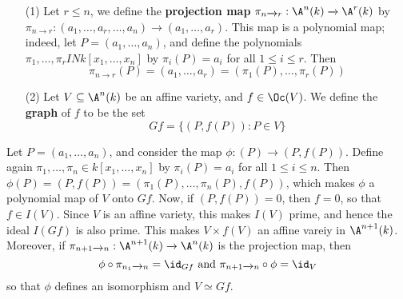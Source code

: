 \begin{example}\label{example_2.2}
  \begin{enumerate}
    \item[(1)] Let $r \leq n$, we define the \textbf{projection map}
      $\pi_{n \xrightarrow{} r}:\A^n(k) \xrightarrow{} \A^r(k)$ by
      $\pi_{n \xrightarrow{} r}:(a_1, \dots, a_r, \dots, a_n) \xrightarrow{}
      (a_1, \dots, a_r)$. This map is a polynomial map; indeed, let $P=(a_1,
      \dots, a_n)$, and define the polynomials $\pi_1, \dots, \pi_r IN k[x_1,
      \dots, x_n]$ by $\pi_i(P)=a_i$ for all $1 \leq i \leq r$. Then
      \begin{equation*}
        \pi_{n \xrightarrow{} r}(P)=(a_1, \dots, a_r)=(\pi_1(P), \dots, \pi_r(P))
      \end{equation*}

    \item[(2)] Let $V \subseteq \A^n(k)$ be an affine variety, and $f \in
      \Oc(V)$. We define the \textbf{graph} of $f$ to be the set
      \begin{equation}\label{equation_2.1}
        G{f}=\{(P, f(P)) : P \in V\}
      \end{equation}
  \end{enumerate}
  Let $P=(a_1, \dots, a_n)$, and consider the map $\phi:(P) \xrightarrow{} (P,
  f(P))$. Define again $\pi_1, \dots, \pi_n \in k[x_1, \dots, x_n]$ by
  $\pi_i(P)=a_i$ for all $1 \leq i \leq n$. Then $\phi(P)=(P,f(P))=(\pi_1(P),
  \dots, \pi_n(P), f(P))$, which makes $\phi$ a polynomial map of $V$ onto $G{f}$.
  Now, if $(P,f(P))=0$, then $f=0$, so that $f \in I(V)$. Since $V$ is an affine
  variety, this makes  $I(V)$ prime, and hence the ideal $I(G{f})$ is also prime.
  This makes $V \times f(V)$ an affine vareiy in $\A^{n+1}(k)$. Moreover, if
  $\pi_{n+1 \xrightarrow{} n}:\A^{n+1}(k) \xrightarrow{} \A^n(k)$ is the
  projection map, then
  \begin{equation*}
    \phi \circ \pi_{n_1 \xrightarrow{} n}=\id_{G{f}} \text{ and }
    \pi_{n+1 \xrightarrow{} n} \circ \phi=\id_{V}
  \end{equation*}
  so that $\phi$ defines an isomorphism and  $V \simeq G{f}$.
\end{example}
